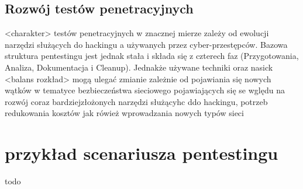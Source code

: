 



\subsection{Rozwój testów penetracyjnych}

<charakter> testów penetracyjnych w znacznej mierze zależy od ewolucji narzędzi służących do hackingu a używanych przez cyber-przestępców. Bazowa struktura pentestingu jest jednak stała i składa się z czterech faz (Przygotowania, Analiza, Dokumentacja i Cleanup). Jednakże używane techniki oraz nasick <balans rozkład> mogą ulegać zmianie zależnie od pojawiania się nowych wątków w tematyce bezbieczeństwa sieciowego pojawiających się se wględu na rozwój coraz bardziejzłożonych narzędzi służącyhc ddo hackingu, potrzeb redukowania kosztów jak rówież wprowadzania nowych typów sieci




\section{przykład scenariusza pentestingu}
\label{sec:zawartoscPracy}

todo





